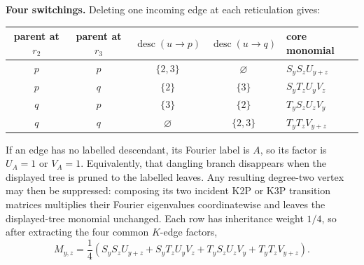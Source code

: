 \documentclass[10pt]{article}
\begin{document}
\textbf{Four switchings.} Deleting one incoming edge at each reticulation gives:
\begin{center}
\small
\begin{tabularx}{\textwidth}{@{}cccc>{\raggedright\arraybackslash}X@{}}
\toprule
\shortstack{parent\\at $r_2$}&\shortstack{parent\\at $r_3$}&$\operatorname{desc}(u\to p)$&$\operatorname{desc}(u\to q)$&core monomial\\
\midrule
$p$&$p$&$\{2,3\}$&$\varnothing$&$S_yS_zU_{y+z}$\\
$p$&$q$&$\{2\}$&$\{3\}$&$S_yT_zU_yV_z$\\
$q$&$p$&$\{3\}$&$\{2\}$&$T_yS_zU_zV_y$\\
$q$&$q$&$\varnothing$&$\{2,3\}$&$T_yT_zV_{y+z}$\\
\bottomrule
\end{tabularx}
\end{center}
If an edge has no labelled descendant, its Fourier label is $A$, so its factor is $U_A=1$ or $V_A=1$. Equivalently, that dangling branch disappears when the displayed tree is pruned to the labelled leaves. Any resulting degree-two vertex may then be suppressed: composing its two incident K2P or K3P transition matrices multiplies their Fourier eigenvalues coordinatewise and leaves the displayed-tree monomial unchanged. Each row has inheritance weight $1/4$, so after extracting the four common $K$-edge factors,
\[
\boxed{M_{y,z}=\frac14\left(S_yS_zU_{y+z}+S_yT_zU_yV_z+T_yS_zU_zV_y+T_yT_zV_{y+z}\right).}
\]
\end{document}
